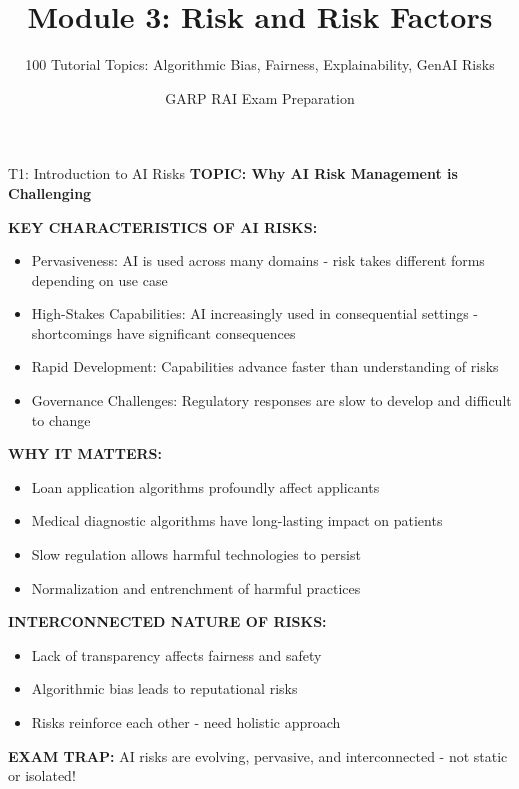 \documentclass[8pt]{beamer}
\title{Module 3: Risk and Risk Factors}
\subtitle{100 Tutorial Topics: Algorithmic Bias, Fairness, Explainability, GenAI Risks}
\author{GARP RAI Exam Preparation}
\date{}
\begin{document}
	
	\begin{frame}
		\titlepage
	\end{frame}
	
	
	\begin{frame}{T1: Introduction to AI Risks}
		\fontsize{6.5}{7.5}\selectfont
		\textbf{TOPIC: Why AI Risk Management is Challenging}
		
		\vspace{0.1cm}
		\textbf{KEY CHARACTERISTICS OF AI RISKS:}
		\begin{itemize}
			\item \textcolor{myblue}{Pervasiveness:} AI is used across many domains - risk takes different forms depending on use case
			\item \textcolor{myblue}{High-Stakes Capabilities:} AI increasingly used in consequential settings - shortcomings have significant consequences
			\item \textcolor{myblue}{Rapid Development:} Capabilities advance faster than understanding of risks
			\item \textcolor{myblue}{Governance Challenges:} Regulatory responses are slow to develop and difficult to change
		\end{itemize}
		
		\vspace{0.1cm}
		\textbf{WHY IT MATTERS:}
		\begin{itemize}
			\item Loan application algorithms profoundly affect applicants
			\item Medical diagnostic algorithms have long-lasting impact on patients
			\item Slow regulation allows harmful technologies to persist
			\item Normalization and entrenchment of harmful practices
		\end{itemize}
		
		\vspace{0.1cm}
		\textbf{INTERCONNECTED NATURE OF RISKS:}
		\begin{itemize}
			\item Lack of transparency affects fairness and safety
			\item Algorithmic bias leads to reputational risks
			\item Risks reinforce each other - need holistic approach
		\end{itemize}
		
		\textcolor{myred}{\textbf{EXAM TRAP:}} AI risks are \textcolor{myblue}{evolving, pervasive, and interconnected} - not static or isolated!
	\end{frame}
	
\end{document}
